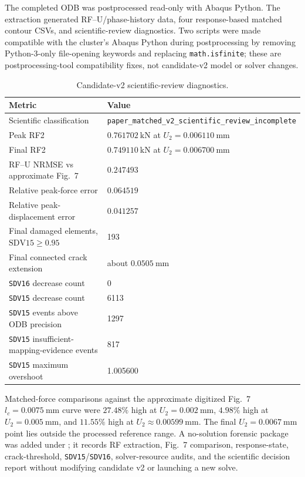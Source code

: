 \documentclass[11pt,a4paper]{article}
\begin{document}
The completed ODB was postprocessed read-only with Abaqus Python. The extraction generated RF--U/phase-history data, four response-based matched contour CSVs, and scientific-review diagnostics. Two scripts were made compatible with the cluster's Abaqus Python during postprocessing by removing Python-3-only file-opening keywords and replacing \texttt{math.isfinite}; these are postprocessing-tool compatibility fixes, not candidate-v2 model or solver changes.

\begin{table}[htbp]
\centering
\caption{Candidate-v2 scientific-review diagnostics.}
\begin{tabular}{@{}ll@{}}
\toprule
Metric & Value \\
\midrule
Scientific classification & \texttt{paper\_matched\_v2\_scientific\_review\_incomplete} \\
Peak RF2 & \(0.761702\ \mathrm{kN}\) at \(U_2=0.006110\ \mathrm{mm}\) \\
Final RF2 & \(0.749110\ \mathrm{kN}\) at \(U_2=0.006700\ \mathrm{mm}\) \\
RF--U NRMSE vs approximate Fig.~7 & \(0.247493\) \\
Relative peak-force error & \(0.064519\) \\
Relative peak-displacement error & \(0.041257\) \\
Final damaged elements, \(\mathrm{SDV15}\ge0.95\) & 193 \\
Final connected crack extension & about \(0.0505\ \mathrm{mm}\) \\
\texttt{SDV16} decrease count & 0 \\
\texttt{SDV15} decrease count & 6113 \\
\texttt{SDV15} events above ODB precision & 1297 \\
\texttt{SDV15} insufficient-mapping-evidence events & 817 \\
\texttt{SDV15} maximum overshoot & 1.005600 \\
\bottomrule
\end{tabular}
\end{table}

Matched-force comparisons against the approximate digitized Fig.~7 \(l_c=0.0075\ \mathrm{mm}\) curve were \(27.48\%\) high at \(U_2=0.002\ \mathrm{mm}\), \(4.98\%\) high at \(U_2=0.005\ \mathrm{mm}\), and \(11.55\%\) high at \(U_2\approx0.00599\ \mathrm{mm}\). The final \(U_2=0.0067\ \mathrm{mm}\) point lies outside the processed reference range. A no-solution forensic package was added under ; it records RF extraction, Fig.~7 comparison, response-state, crack-threshold, \texttt{SDV15}/\texttt{SDV16}, solver-resource audits, and the scientific decision report without modifying candidate v2 or launching a new solve.
\end{document}
